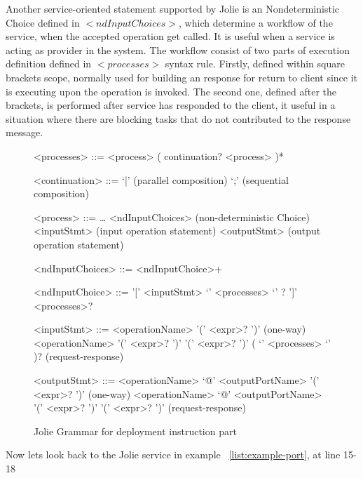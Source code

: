 Another service-oriented statement supported by Jolie is an Nondeterministic Choice defined in \(<ndInputChoices>\), which determine a workflow of the service, when the accepted operation get called. It is useful when a service is acting as provider in the system. The workflow consist of two parts of execution definition defined in \(<processes>\) syntax rule. Firstly, defined within square brackets scope, normally used for building an response for return to client since it is executing upon the operation is invoked. The second one, defined after the brackets, is performed after service has responded to the client, it useful in a situation where there are blocking tasks that do not contributed to the response message.

\begin{figure}[h]
    \begin{framed}
        \begin{grammar}
            <processes>
            ::= <process> ( continuation? <process> )*

            <continuation> ::= `|' \hfill (parallel composition)
            \alt `;' \hfill (sequential composition)

            <process> ::= \dots
            \alt <ndInputChoices> \hfill (non-deterministic Choice)
            \alt <inputStmt> \hfill (input operation statement)
            \alt <outputStmt> \hfill (output operation statement)

            <ndInputChoices>
            ::= <ndInputChoice>+

            <ndInputChoice>
            ::= '[' <inputStmt> `{' <processes> `}' ? ']' <processes>?

            <inputStmt>
            ::= <operationName> '(' <expr>? ')' \hfill (one-way)
            \alt
            <operationName> '(' <expr>? ')' '(' <expr>? ')' ( `{' <processes> `}' )? \hfill (request-response)

            <outputStmt>
            ::= <operationName> `@' <outputPortName> '(' <expr>? ')' \hfill (one-way)
            \alt
            <operationName> `@' <outputPortName> '(' <expr>? ')' '(' <expr>? ')' \hfill (request-response)
        \end{grammar}
    \end{framed}
    \caption{Jolie Grammar for deployment instruction part}
    \label{fig:jolie-process}
\end{figure}

Now lets look back to the Jolie service in example ~\ref{list:example-port}, at line 15-18

